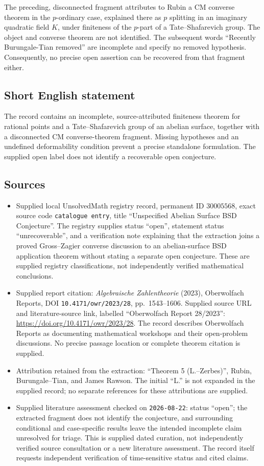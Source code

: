 \documentclass[11pt]{article}
\begin{document}
The preceding, disconnected fragment attributes to Rubin a CM converse theorem in the \(p\)-ordinary case, explained there as \(p\) splitting in an imaginary quadratic field \(K\), under finiteness of the \(p\)-part of a Tate--Shafarevich group. The object and converse theorem are not identified. The subsequent words ``Recently Burungale-Tian removed'' are incomplete and specify no removed hypothesis. Consequently, no precise open assertion can be recovered from that fragment either.
\subsection{Short English statement}
The record contains an incomplete, source-attributed finiteness theorem for rational points and a Tate--Shafarevich group of an abelian surface, together with a disconnected CM converse-theorem fragment. Missing hypotheses and an undefined deformability condition prevent a precise standalone formulation. The supplied open label does not identify a recoverable open conjecture.
\subsection{Sources}
\begin{itemize}
\item Supplied local UnsolvedMath registry record, permanent ID \(30005568\), exact source code \texttt{catalogue entry}, title ``Unspecified Abelian Surface BSD Conjecture''. The registry supplies status ``open'', statement status ``unrecoverable'', and a verification note explaining that the extraction joins a proved Gross--Zagier converse discussion to an abelian-surface BSD application theorem without stating a separate open conjecture. These are supplied registry classifications, not independently verified mathematical conclusions.
\item Supplied report citation: \emph{Algebraische Zahlentheorie} (2023), Oberwolfach Reports, DOI \texttt{10.4171/owr/2023/28}, pp.\ 1543--1606. Supplied source URL and literature-source link, labelled ``Oberwolfach Report 28/2023'': \url{https://doi.org/10.4171/owr/2023/28}. The record describes Oberwolfach Reports as documenting mathematical workshops and their open-problem discussions. No precise passage location or complete theorem citation is supplied.
\item Attribution retained from the extraction: ``Theorem 5 (L.--Zerbes)'', Rubin, Burungale--Tian, and James Rawson. The initial ``L.'' is not expanded in the supplied record; no separate references for these attributions are supplied.
\item Supplied literature assessment checked on \texttt{2026-08-22}: status ``open''; the extracted fragment does not identify the conjecture, and surrounding conditional and case-specific results leave the intended incomplete claim unresolved for triage. This is supplied dated curation, not independently verified source consultation or a new literature assessment. The record itself requests independent verification of time-sensitive status and cited claims.
\end{itemize}
\end{document}
